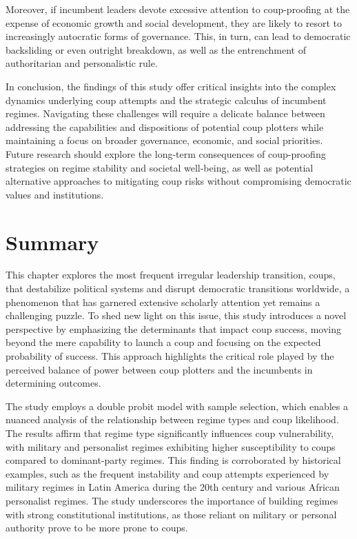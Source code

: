 \documentclass[
  12pt,
]{report}
\begin{document}
Moreover, if incumbent leaders devote excessive attention to
coup-proofing at the expense of economic growth and social development,
they are likely to resort to increasingly autocratic forms of
governance. This, in turn, can lead to democratic backsliding or even
outright breakdown, as well as the entrenchment of authoritarian and
personalistic rule.

In conclusion, the findings of this study offer critical insights into
the complex dynamics underlying coup attempts and the strategic calculus
of incumbent regimes. Navigating these challenges will require a
delicate balance between addressing the capabilities and dispositions of
potential coup plotters while maintaining a focus on broader governance,
economic, and social priorities. Future research should explore the
long-term consequences of coup-proofing strategies on regime stability
and societal well-being, as well as potential alternative approaches to
mitigating coup risks without compromising democratic values and
institutions.

\section{Summary}\label{summary}

This chapter explores the most frequent irregular leadership transition,
coups, that destabilize political systems and disrupt democratic
transitions worldwide, a phenomenon that has garnered extensive
scholarly attention yet remains a challenging puzzle. To shed new light
on this issue, this study introduces a novel perspective by emphasizing
the determinants that impact coup success, moving beyond the mere
capability to launch a coup and focusing on the expected probability of
success. This approach highlights the critical role played by the
perceived balance of power between coup plotters and the incumbents in
determining outcomes.

The study employs a double probit model with sample selection, which
enables a nuanced analysis of the relationship between regime types and
coup likelihood. The results affirm that regime type significantly
influences coup vulnerability, with military and personalist regimes
exhibiting higher susceptibility to coups compared to dominant-party
regimes. This finding is corroborated by historical examples, such as
the frequent instability and coup attempts experienced by military
regimes in Latin America during the 20th century and various African
personalist regimes. The study underscores the importance of building
regimes with strong constitutional institutions, as those reliant on
military or personal authority prove to be more prone to coups.
\end{document}
